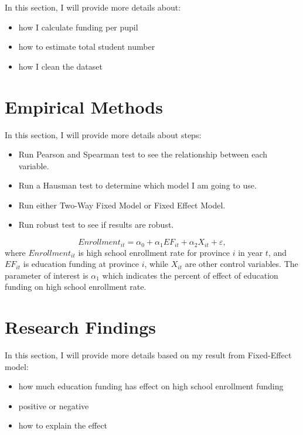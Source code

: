 \documentclass[12pt,english]{article}
\begin{document}
In this section, I will provide more details about:
	     \begin{itemize} 
	           \item how I calculate funding per pupil
	           \item how to estimate total student number 
	           \item how I clean the dataset 
         \end{itemize}
         

\section{Empirical Methods}\label{sec:methods}

In this section, I will provide more details about steps:
	     \begin{itemize} 
	           \item Run Pearson and Spearman test to see the relationship between each variable.
	           \item Run a Hausman test to determine which model I am going to use.
	           \item Run either Two-Way Fixed Model or Fixed Effect Model.
	           \item Run robust test to see if results are robust.
         \end{itemize}

\begin{equation}
\label{eq:1}
Enrollment_{it}=\alpha_{0} + \alpha_{1}EF_{it} + \alpha_{2} X_{it} + \varepsilon,
\end{equation}
where $Enrollment_{it}$ is high school enrollment rate for province $i$ in year $t$, and $EF_{it}$ is education funding at province $i$, while $X_{it}$ are other control variables. The parameter of interest is $\alpha_{1}$ which indicates the percent of effect of education funding on high school enrollment rate.



\section{Research Findings}\label{sec:results}

In this section, I will provide more details based on my result from Fixed-Effect model:
	     \begin{itemize} 
	           \item how much education funding has effect on high school enrollment funding
	           \item positive or negative 
	           \item how to explain the effect
         \end{itemize}
\end{document}
